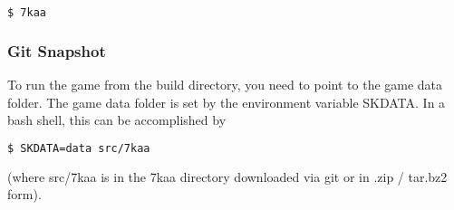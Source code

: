 \begin{lstlisting}[language=bash]
$ 7kaa
\end{lstlisting}

\subsubsection{Git Snapshot}

To run the game from the build directory, you need to point to the game data folder. The game data folder is set by the environment variable SKDATA. In a bash shell, this can be accomplished by

\begin{lstlisting}[language=bash]
$ SKDATA=data src/7kaa
\end{lstlisting}

(where src/7kaa is in the 7kaa directory downloaded via git or in .zip / tar.bz2 form).
